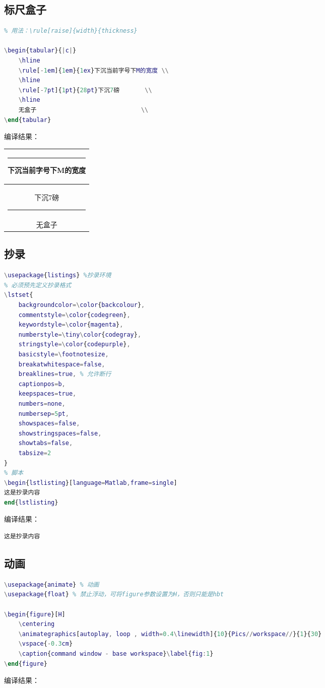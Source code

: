 \documentclass[UTF8,oneside]{ctexbook}
\begin{document}
\subsection{标尺盒子}
\begin{lstlisting}[language=Matlab,frame=single]
% 无宏包
% 用法：\rule[raise]{width}{thickness}

\begin{tabular}{|c|}
    \hline
    \rule[-1em]{1em}{1ex}下沉当前字号下M的宽度 \\
    \hline
    \rule[-7pt]{1pt}{28pt}下沉7磅       \\
    \hline
    无盒子                             \\
\end{tabular}
\end{lstlisting}
编译结果：\\
\begin{tabular}{|c|}
    \hline
    \rule[-1em]{1em}{1ex}下沉当前字号下M的宽度 \\
    \hline
    下沉7磅\rule[-7pt]{1pt}{28pt}   \\
    \hline
    无盒子                        \\
    \hline
\end{tabular}

\subsection{抄录}
\begin{lstlisting}[language=Matlab,frame=single]
\usepackage{listings} %抄录环境
% 必须预先定义抄录格式
\lstset{
	backgroundcolor=\color{backcolour},
	commentstyle=\color{codegreen},
	keywordstyle=\color{magenta},
	numberstyle=\tiny\color{codegray},
	stringstyle=\color{codepurple},
	basicstyle=\footnotesize,
	breakatwhitespace=false,
	breaklines=true, % 允许断行                 
	captionpos=b,
	keepspaces=true,
	numbers=none,
	numbersep=5pt,
	showspaces=false,
	showstringspaces=false,
	showtabs=false,
	tabsize=2
}
% 脚本
\begin{lstlisting}[language=Matlab,frame=single]
这是抄录内容
end{lstlisting}   
\end{lstlisting}
编译结果：\\
\begin{lstlisting}[language=Matlab,frame=single]
这是抄录内容
\end{lstlisting}

\subsection{动画}
\begin{lstlisting}[language=Matlab,frame=single]
\usepackage{animate} % 动画
\usepackage{float} % 禁止浮动，可将figure参数设置为H，否则只能是hbt

\begin{figure}[H]
    \centering
    \animategraphics[autoplay, loop , width=0.4\linewidth]{10}{Pics//workspace//}{1}{30}
    \vspace{-0.3cm}
    \caption{command window - base workspace}\label{fig:1}
\end{figure}
\end{lstlisting}
编译结果：\\
\end{document}
